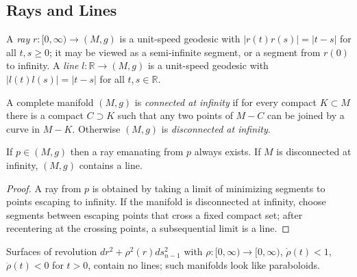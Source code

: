 \subsection{Rays and Lines}

\begin{definition}
  \label{def:pet-ch7-ray-line}

  A \emph{ray} $r:[0,\infty)\to(M,g)$ is a unit-speed geodesic with
  $|r(t)r(s)|=|t-s|$ for all $t,s\ge0$; it may be viewed as a semi-infinite
  segment, or a segment from $r(0)$ to infinity. A \emph{line}
  $l:\mathbb{R}\to(M,g)$ is a unit-speed geodesic with $|l(t)l(s)|=|t-s|$ for all
  $t,s\in\mathbb{R}$.
\end{definition}

\begin{definition}
  \label{def:pet-ch7-connected-infinity}

  A complete manifold $(M,g)$ is \emph{connected at infinity} if for every
  compact $K\subset M$ there is a compact $C\supset K$ such that any two
  points of $M-C$ can be joined by a curve in $M-K$. Otherwise $(M,g)$ is
  \emph{disconnected at infinity}.
\end{definition}

\begin{lemma}
  \label{lem:pet-ch7-ray-line-existence}

  If $p\in(M,g)$ then a ray emanating from $p$ always exists. If $M$ is
  disconnected at infinity, $(M,g)$ contains a line.
\end{lemma}
\begin{proof}
  \sketch
  A ray from \(p\) is obtained by taking a limit of minimizing segments to points escaping to infinity. If the manifold is disconnected at infinity, choose segments between escaping points that cross a fixed compact set; after recentering at the crossing points, a subsequential limit is a line.
\end{proof}

\begin{example}
  \label{ex:pet-ch7-paraboloid-no-lines}

  Surfaces of revolution $dr^2+\rho^2(r)ds^2_{n-1}$ with $\rho:[0,\infty)\to
  [0,\infty)$, $\dot\rho(t)<1$, $\ddot\rho(t)<0$ for $t>0$, contain no lines;
  such manifolds look like paraboloids.
\end{example}

